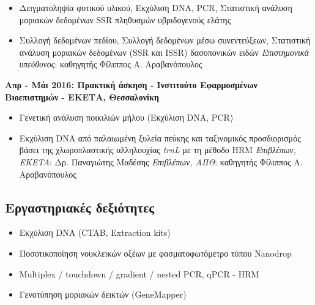 \documentclass[12pt,]{scrartcl}
\begin{document}
\vspace{3mm}
\begin{itemize}
\vspace{-3mm}
\setlength\itemsep{-0.6em}
\item Δειγματοληψία φυτικού υλικού, Εκχύλιση DNA, PCR, Στατιστική ανάλυση μοριακών δεδομένων SSR πληθυσμών υβριδογενούς ελάτης
\item Συλλογή δεδομένων πεδίου, Συλλογή δεδομένων μέσω συνεντεύξεων, Στατιστική ανάλυση μοριακών δεδομένων (SSR και ISSR) δασοπονικών ειδών 
\vspace{2mm}
\newline
\textit{Επιστημονικά υπεύθυνος}: καθηγητής Φίλιππος Α. Αραβανόπουλος
\end{itemize}

\vspace{3mm}
\textbf{Απρ - Μάι 2016: Πρακτική άσκηση - Ινστιτούτο Εφαρμοσμένων Βιοεπιστημών - ΕΚΕΤΑ, Θεσσαλονίκη}


\vspace{3mm}
\begin{itemize}
\vspace{-3mm}
\setlength\itemsep{-0.6em}
\item Γενετική ανάλυση ποικιλιών μήλου (Εκχύλιση DNA, PCR) 
\item Εκχύλιση DNA από παλαιωμένη ξυλεία πεύκης και ταξινομικός προσδιορισμός βάσει της χλωροπλαστικής αλληλουχίας \textit{trnL} με τη μέθοδο HRM
\vspace{2mm}
\newline
\textit{Επιβλέπων, EKETA}: Δρ. Παναγιώτης Μαδέσης
\newline
\textit{Επιβλέπων, ΑΠΘ}: καθηγητής Φίλιππος Α. Αραβανόπουλος
\end{itemize}

\subsection{Εργαστηριακές δεξιότητες}\label{lab}
\begin{itemize}
\vspace{-3mm}
\setlength\itemsep{-0.6em}
\item Εκχύλιση DNA (CTAB, Extraction kits)
\item Ποσοτικοποίηση νουκλεικών οξέων με φασματοφωτόμετρο τύπου Nanodrop
\item Multiplex / touchdown / gradient / nested PCR, qPCR - HRM
\item Γενοτύπηση μοριακών δεικτών (GeneMapper)
\end{itemize}
\end{document}
